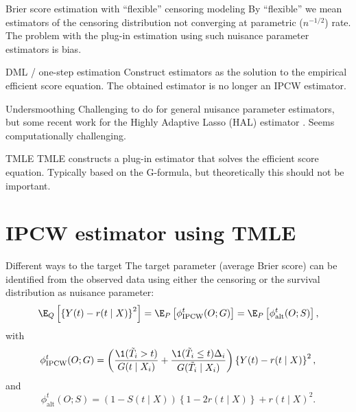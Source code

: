 \documentclass[smaller]{beamer}\usepackage{listings}
\begin{document}
\begin{frame}[label={sec:org3930b95}]{Brier score estimation with ``flexible'' censoring modeling}
By ``flexible'' we mean estimators of the censoring distribution not converging at parametric
(\(n^{-1/2}\)) rate. The problem with the plug-in estimation using such nuisance parameter
estimators is \alert{bias}.
\vfill \pause

\begin{block}{DML \small \citep{chernozhukov2017double} \large / one-step estimation}
Construct estimators as the solution to the empirical efficient score equation. The obtained
estimator is no longer an IPCW estimator. \pause
\end{block}

\begin{block}{Undersmoothing}
Challenging to do for general nuisance parameter estimators, but some recent work for the Highly
Adaptive Lasso (HAL) estimator \small
\citep{ertefaie2020nonparametric,van2019efficient}\normalsize. Seems computationally
challenging. \pause
\end{block}

\begin{block}{TMLE \small \citep{van2011targeted,van2006targeted}}
TMLE constructs a \alert{plug-in estimator} that solves the efficient score equation. Typically based
on the G-formula, but theoretically this should not be important.
\end{block}
\end{frame}

\section{IPCW estimator using TMLE}
\label{sec:orga7f4794}
\begin{frame}[label={sec:org74c8474}]{Different ways to the target}
The target parameter (average Brier score) can be identified from the observed data using either
the censoring or the survival distribution as nuisance parameter:
\begin{equation*}
  \E_Q\left[ 
    \left\{
      Y(t) - r(t \mid X)
    \right\}^2 \right]
  = \E_P\left[ \phi^t_{\mathrm{IPCW}}(O; G) \right]
  = \E_P\left[ \phi^t_{\mathrm{alt}}(O; S) \right],
\end{equation*}
with
\begin{equation*}
  \phi^t_{\mathrm{IPCW}}(O; G) = 
  \left(
    \frac{\1({\tilde{T}_i >t})}{G(t \mid X_i)} + \frac{\1({\tilde{T}_i\leq
	t})\Delta_i}{G(\tilde{T}_i\mid X_i)}
  \right) \left\{
    Y(t) - r(t \mid X)
  \right\}^2,
\end{equation*}
and
\begin{equation*}
  \phi^t_{\mathrm{alt}}(O; S) = 
  \left(
    1- S(t \mid X)
  \right) \left\{
    1 - 2r(t \mid X) 
  \right\}  + r(t\mid X)^2.
\end{equation*}
\end{frame}
\end{document}
